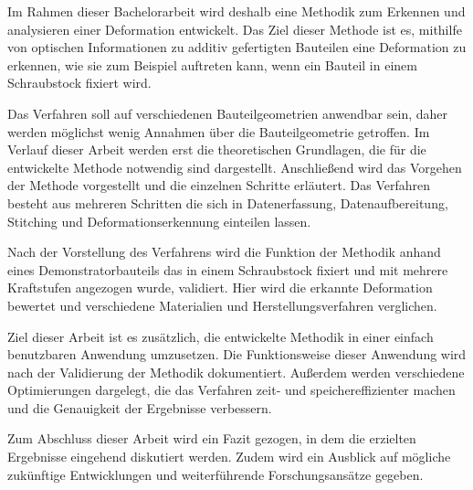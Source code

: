 Im Rahmen dieser Bachelorarbeit wird deshalb eine Methodik zum Erkennen und 
analysieren einer Deformation entwickelt. Das Ziel dieser Methode ist es, 
mithilfe von optischen Informationen zu additiv gefertigten Bauteilen eine 
Deformation zu erkennen, wie sie zum Beispiel auftreten kann, wenn ein Bauteil 
in einem Schraubstock fixiert wird.

Das Verfahren soll auf verschiedenen Bauteilgeometrien anwendbar sein, daher werden 
möglichst wenig Annahmen über die Bauteilgeometrie getroffen.
Im Verlauf dieser Arbeit werden erst die theoretischen Grundlagen, die für die 
entwickelte Methode notwendig sind dargestellt. 
Anschließend wird das Vorgehen der Methode vorgestellt und die einzelnen 
Schritte erläutert. Das Verfahren besteht aus mehreren Schritten die sich in 
Datenerfassung, Datenaufbereitung, Stitching und Deformationserkennung 
einteilen lassen.

Nach der Vorstellung des Verfahrens wird die Funktion der Methodik anhand eines 
Demonstratorbauteils das in einem Schraubstock fixiert und mit mehrere Kraftstufen 
angezogen wurde, validiert. Hier wird die erkannte Deformation bewertet und 
verschiedene Materialien und Herstellungsverfahren verglichen.

Ziel dieser Arbeit ist es zusätzlich, die entwickelte Methodik in einer einfach
benutzbaren Anwendung umzusetzen. Die Funktionsweise dieser Anwendung wird 
nach der Validierung der Methodik dokumentiert. Außerdem werden verschiedene 
Optimierungen dargelegt, die das Verfahren zeit- und speichereffizienter machen
und die Genauigkeit der Ergebnisse verbessern.

Zum Abschluss dieser Arbeit wird ein Fazit gezogen, in dem die erzielten 
Ergebnisse eingehend diskutiert werden. Zudem wird ein Ausblick auf 
mögliche zukünftige Entwicklungen und weiterführende Forschungsansätze gegeben.



